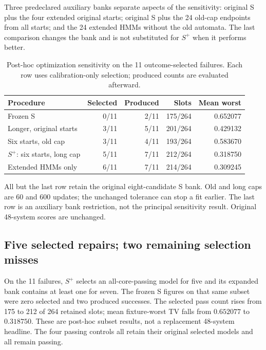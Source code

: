 Three predeclared auxiliary banks separate aspects of the sensitivity: original S plus the four extended original starts; original S plus the 24 old-cap endpoints from all starts; and the 24 extended HMMs without the old automata. The last comparison changes the bank and is not substituted for $S^+$ when it performs better.


\begin{table}[tbp]
\centering\caption{Post-hoc optimization sensitivity on the 11 outcome-selected failures. Each row uses calibration-only selection; produced counts are evaluated afterward.}\label{tab:sensitivity-arms}
\small\begin{tabular}{@{}lrrrr@{}}\toprule
Procedure & Selected & Produced & Slots & Mean worst\\\midrule
Frozen S & 0/11 & 2/11 & 175/264 & 0.652077\\
Longer, original starts & 3/11 & 5/11 & 201/264 & 0.429132\\
Six starts, old cap & 3/11 & 4/11 & 193/264 & 0.583670\\
$S^+$: six starts, long cap & 5/11 & 7/11 & 212/264 & 0.318750\\
Extended HMMs only & 6/11 & 7/11 & 214/264 & 0.309245\\\bottomrule
\end{tabular}
\par\smallskip\footnotesize All but the last row retain the original eight-candidate S bank. Old and long caps are 60 and 600 updates; the unchanged tolerance can stop a fit earlier. The last row is an auxiliary bank restriction, not the principal sensitivity result. Original 48-system scores are unchanged.
\end{table}


\subsection{Five selected repairs; two remaining selection misses}\label{p3:s03}
On the 11 failures, $S^+$ selects an all-core-passing model for five and its expanded bank contains at least one for seven. The frozen S figures on that same subset were zero selected and two produced successes. The selected pass count rises from 175 to 212 of 264 retained slots; mean fixture-worst TV falls from $0.652077$ to $0.318750$. These are post-hoc subset results, not a replacement 48-system headline. The four passing controls all retain their original selected models and all remain passing.

